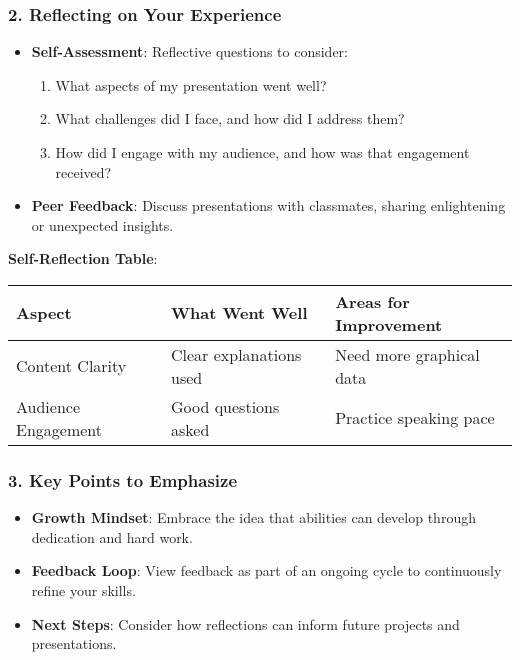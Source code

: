 \documentclass[aspectratio=169]{beamer}
\begin{document}
\begin{frame}[fragile]
    \frametitle{2. Reflecting on Your Experience}
    \begin{itemize}
        \item \textbf{Self-Assessment}: Reflective questions to consider:
        \begin{enumerate}
            \item What aspects of my presentation went well?
            \item What challenges did I face, and how did I address them?
            \item How did I engage with my audience, and how was that engagement received?
        \end{enumerate}
        \item \textbf{Peer Feedback}: Discuss presentations with classmates, sharing enlightening or unexpected insights.
    \end{itemize}
    
    \textbf{Self-Reflection Table}:
    \begin{tabular}{|l|l|l|}
        \hline
        \textbf{Aspect} & \textbf{What Went Well} & \textbf{Areas for Improvement} \\
        \hline
        Content Clarity & Clear explanations used & Need more graphical data \\
        \hline
        Audience Engagement & Good questions asked & Practice speaking pace \\
        \hline
    \end{tabular}
\end{frame}

\begin{frame}[fragile]
    \frametitle{3. Key Points to Emphasize}
    \begin{itemize}
        \item \textbf{Growth Mindset}: Embrace the idea that abilities can develop through dedication and hard work.
        \item \textbf{Feedback Loop}: View feedback as part of an ongoing cycle to continuously refine your skills.
        \item \textbf{Next Steps}: Consider how reflections can inform future projects and presentations.
    \end{itemize}
\end{frame}
\end{document}
